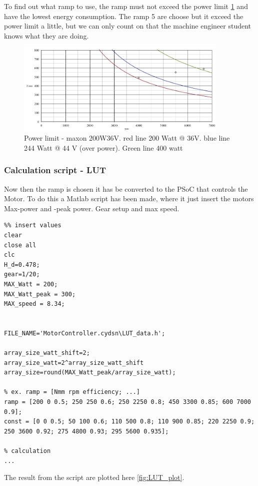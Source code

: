 To find out what ramp to use, the ramp must not exceed the power limit \ref{fig:eff_maxon_36V_Power_limit} and have the lowest energy consumption. The ramp 5 are choose but it exceed the power limit a little, but we can only count on that the machine engineer student knows what they are doing. 

\begin{figure}[H]
	\centering
	\includegraphics [width=4in]{Software/Pictures/Power_limit.PNG}
	\caption{Power limit - maxon 200W36V. red line 200 Watt @ 36V. blue line 244 Watt @ 44 V (over power). Green line 400 watt}
	\label{fig:eff_maxon_36V_Power_limit}
\end{figure}

\subsubsection{Calculation script - LUT}

Now then the ramp is chosen it has be converted to the PSoC that controls the Motor. To do this a Matlab script has been made, where it just insert the motors Max-power and -peak power. Gear setup and max speed.    
\lstset{language=matlab}
\begin{lstlisting}
%% insert values
clear
close all
clc
H_d=0.478;
gear=1/20;
MAX_Watt = 200;
MAX_Watt_peak = 300;
MAX_speed = 8.34;


FILE_NAME='MotorController.cydsn\LUT_data.h';

array_size_watt_shift=2;
array_size_watt=2^array_size_watt_shift
array_size=round(MAX_Watt_peak/array_size_watt);

% ex. ramp = [Nmm rpm efficiency; ...]
ramp = [200 0 0.5; 250 250 0.6; 250 2250 0.8; 450 3300 0.85; 600 7000 0.9];
const = [0 0 0.5; 50 100 0.6; 110 500 0.8; 110 900 0.85; 220 2250 0.9; 250 3600 0.92; 275 4800 0.93; 295 5600 0.935];

% calculation
...
\end{lstlisting}

The result from the script are plotted here \ref{fig:LUT_plot}. 

